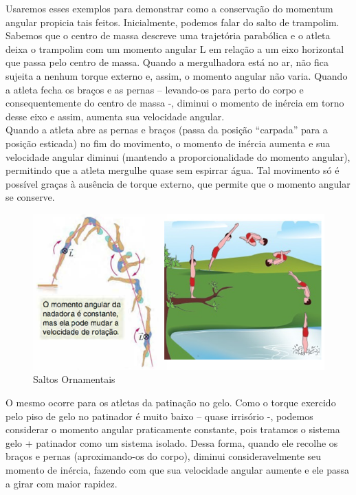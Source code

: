 Usaremos esses exemplos para demonstrar como a conservação do momentum angular propicia tais feitos. Inicialmente, podemos falar do salto de trampolim. Sabemos que o centro de massa descreve uma trajetória parabólica e o atleta deixa o trampolim com um momento angular L em relação a um eixo horizontal que passa pelo centro de massa. Quando a mergulhadora está no ar, não fica sujeita a nenhum torque externo e, assim, o momento angular não varia. Quando a atleta fecha os braços e as pernas – levando-os para perto do corpo e consequentemente do centro de massa -, diminui o momento de inércia em torno desse eixo e assim, aumenta sua velocidade angular.\\

Quando a atleta abre as pernas e braços (passa da posição “carpada” para a posição esticada) no fim do movimento, o momento de inércia aumenta e sua velocidade angular diminui (mantendo a proporcionalidade do momento angular), permitindo que a atleta mergulhe quase sem espirrar água. Tal movimento só é possível graças à ausência de torque externo, que permite que o momento angular se conserve. \\

\begin{figure}[H]
  \centering
  \includegraphics[scale=1.3]{images/i1.png}
  \caption{Saltos Ornamentais}
\end{figure}

O mesmo ocorre para os atletas da patinação no gelo. Como o torque exercido pelo piso de gelo no patinador é muito baixo – quase irrisório -, podemos considerar o momento angular praticamente constante, pois tratamos o sistema gelo + patinador como um sistema isolado. Dessa forma, quando ele recolhe os braços e pernas (aproximando-os do corpo), diminui consideravelmente seu momento de inércia, fazendo com que sua velocidade angular aumente e ele passa a girar com maior rapidez.\\ 

